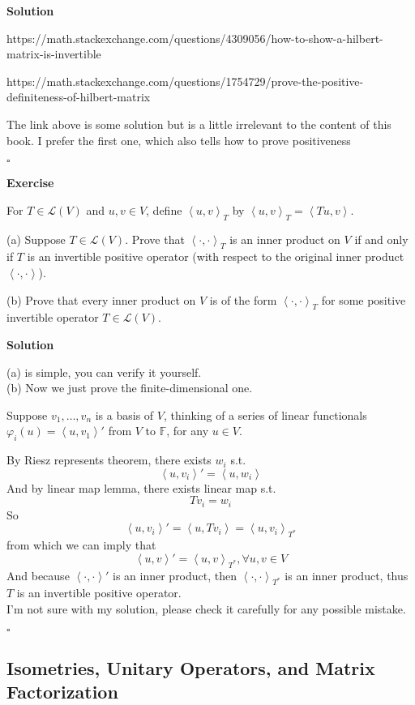 \documentclass{article}
\newenvironment{exercise}{%
{\textbf{Exercise\\}
    }
}{
}
\newenvironment{solution}{%
{
    \textbf{Solution\\}
    }
}{
  \hfill $\square$ 
  \par\bigskip 
}
\newcommand{\FF}{\mathbb{F}}
\begin{document}
\begin{CJK}{UTF8}{gkai}
\begin{solution}
    https://math.stackexchange.com/questions/4309056/how-to-show-a-hilbert-matrix-is-invertible
 
    https://math.stackexchange.com/questions/1754729/prove-the-positive-definiteness-of-hilbert-matrix

    The link above is some solution but is a little irrelevant to the content of this book. I prefer the first one, which also tells how to prove positiveness
\end{solution}

\begin{exercise}
    For $T \in\mathcal{L}(V)$ and $u,v \in V$, define $\left<u,v\right>_T$ by $\left<u,v\right>_T = \left<Tu,v\right>$.

    (a) Suppose $T \in \mathcal{L}(V)$. Prove that $\left<\cdot,\cdot\right>_T$ is an inner product on $V$ if and only if $T$ is an invertible positive operator (with respect to the original inner product $\left<\cdot,\cdot\right>$).

    (b) Prove that every inner product on $V$ is of the form $\left<\cdot,\cdot\right>_T$ for some positive
    invertible operator $T \in \mathcal{L}(V)$.
\end{exercise}

\begin{solution}
    (a) is simple, you can verify it yourself.\\

    (b) Now we just prove the finite-dimensional one.

    Suppose $v_1,\ldots,v_n$ is a basis of $V$, thinking of a series of linear functionals $\varphi_i(u) = \left<u,v_1\right>'$ from $V$ to $\FF$, for any $u \in V$.

    By Riesz represents theorem, there exists $w_i$ s.t. 
    \[\left<u,v_i\right>' = \left<u,w_i\right>\]
    And by linear map lemma, there exists linear map s.t.
    \[T v_i = w_i\]
    So 
    \[\left<u,v_i\right>' = \left<u,T v_i\right> = \left<u, v_i\right>_{T^\ast}\]
    from which we can imply that 
    \[\left<u,v\right>' = \left<u, v\right>_{T^\ast}, \forall u,v \in V \]
    And because $\left<\cdot,\cdot\right>'$ is an inner product, then $\left<\cdot,\cdot\right>_{T^\ast}$ is an inner product, thus $T$ is an invertible positive operator.\\
    
    I'm not sure with my solution, please check it carefully for any possible mistake.
\end{solution}
\subsection{Isometries, Unitary Operators, and Matrix Factorization}


\end{CJK}
\end{document}
